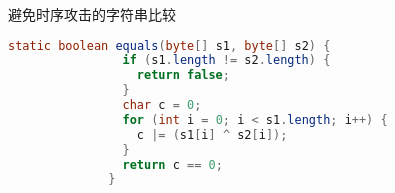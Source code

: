 避免时序攻击的字符串比较

\begin{lstlisting}[language=java]
        static boolean equals(byte[] s1, byte[] s2) {
                if (s1.length != s2.length) {
                  return false;
                }
                char c = 0;
                for (int i = 0; i < s1.length; i++) {
                  c |= (s1[i] ^ s2[i]);
                }
                return c == 0;
              }
        
\end{lstlisting}













































